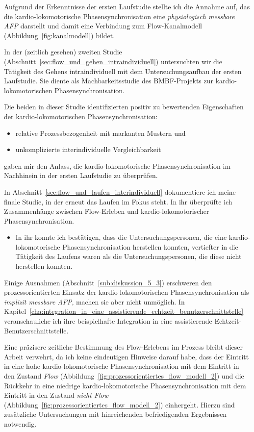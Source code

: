 Aufgrund der Erkenntnisse der ersten Laufstudie stellte ich die Annahme auf, das die kardio-lokomotorische Phasensynchronisation eine \emph{physiologisch messbare \ac{AFP}} darstellt und damit eine Verbindung zum Flow-Kanalmodell (Abbildung~\ref{fig:kanalmodell}) bildet.

In der (zeitlich gesehen) zweiten Studie (Abschnitt~\ref{sec:flow_und_gehen_intraindividuell}) untersuchten wir die Tätigkeit des Gehens intraindividuell mit dem Untersuchungsaufbau der ersten Laufstudie. Sie diente als Machbarkeitsstudie des \acs{BMBF}-Projekts zur kardio-lokomotorischen Phasensynchronisation. 

Die beiden in dieser Studie identifizierten positiv zu bewertenden Eigenschaften der kardio-lokomotorischen Phasensynchronisation: 
\begin{itemize}
	
	\item relative Prozessbezogenheit mit markanten Mustern und
	
	\item unkomplizierte interindividuelle Vergleichbarkeit 
\end{itemize}

gaben mir den Anlass, die kardio-lokomotorische Phasensynchronisation im Nachhinein in der ersten Laufstudie zu überprüfen. 

In Abschnitt~\ref{sec:flow_und_laufen_interindividuell} dokumentiere ich meine finale Studie, in der erneut das Laufen im Fokus steht. In ihr überprüfte ich Zusammenhänge zwischen Flow-Erleben und kardio-lokomotorischer Phasensynchronisation. 
\begin{itemize}
	
	\item In ihr konnte ich bestätigen, dass die Untersuchungspersonen, die eine kardio-lokomotorische Phasensynchronisation herstellen konnten, vertiefter in die Tätigkeit des Laufens waren als die Untersuchungspersonen, die diese nicht herstellen konnten. 
\end{itemize}

Einige Ausnahmen (Abschnitt~\ref{sub:diskussion_5_3}) erschweren den prozessorientierten Einsatz der kardio-lokomotorischen Phasensynchronisation als \emph{implizit messbare \ac{AFP}}, machen sie aber nicht unmöglich. In Kapitel~\ref{cha:integration_in_eine_assistierende_echtzeit_benutzerschnittstelle} veranschauliche ich ihre beispielhafte Integration in eine assistierende Echtzeit-Benutzerschnittstelle.

Eine präzisere zeitliche Bestimmung des Flow-Erlebens im Prozess bleibt dieser Arbeit verwehrt, da ich keine eindeutigen Hinweise darauf habe, dass der Eintritt in eine hohe kardio-lokomotorische Phasensynchronisation mit dem Eintritt in den Zustand \emph{Flow} (Abbildung~\ref{fig:prozessorientiertes_flow_modell_2}) und die Rückkehr in eine niedrige kardio-lokomotorische Phasensynchronisation mit dem Eintritt in den Zustand \emph{nicht Flow} (Abbildung~\ref{fig:prozessorientiertes_flow_modell_2}) einhergeht. Hierzu sind zusätzliche Untersuchungen mit hinreichenden befriedigenden Ergebnissen notwendig. 
